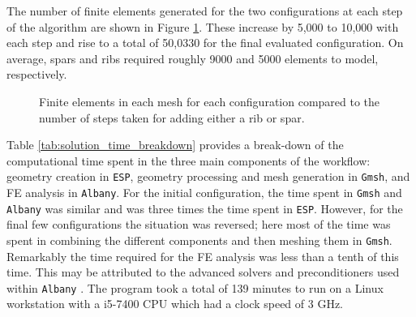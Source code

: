\documentclass[conf]{new-aiaa}
\begin{document}
The number of finite elements generated for the two configurations 
at each step of the algorithm are 
shown in Figure \ref{fig:num_elements_steps}.
These increase by 5,000 to 10,000 with each step 
and rise to a total of 50,0330 for the final evaluated configuration.
On average, spars and ribs required roughly 
9000 and 5000 elements to model, respectively.

\begin{figure}[H]
  \centering
  \caption{ Finite elements in each mesh for each configuration
            compared to the number of steps taken
            for adding either a rib or spar.}
  \label{fig:num_elements_steps}
\end{figure}

Table \ref{tab:solution_time_breakdown} provides a break-down of the 
computational time spent in the three main components of the workflow: 
geometry creation in \texttt{ESP}, 
geometry processing and mesh generation in \texttt{Gmsh}, 
and FE analysis in \texttt{Albany}. 
For the initial configuration, the time spent in \texttt{Gmsh} 
and \texttt{Albany}
was similar and was three times the time spent in \texttt{ESP}. 
However, for the final few configurations the situation was reversed;
here most of the time was spent in combining the different components 
and then meshing them in \texttt{Gmsh}. 
Remarkably the time required for the FE analysis 
was less than a tenth of this time.
This may be attributed to the advanced solvers and preconditioners 
used within 
\texttt{Albany} 
\cite{salinger_albany_using_component_based_design_to_dev_flex_multiphysics}.
The program took a total of 139 minutes to run on a Linux
workstation with a i5-7400 CPU which had a clock speed of 3 GHz.
\end{document}
